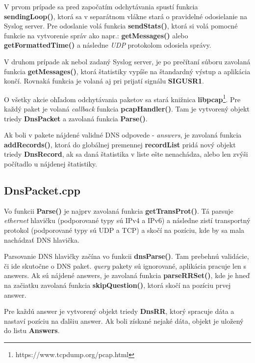 \documentclass{article}
\begin{document}
        V prvom prípade sa pred započatím odchytávania spustí funkcia \textbf{sendingLoop()},
        ktorá sa v separátnom vlákne stará o pravidelné odosielanie na Syslog server. Pre odoslanie volá funkcia \textbf{sendStats()}, ktorá si volá
        pomocné funkcie na vytvorenie správ ako napr.: \textbf{getMessages()} alebo \textbf{getFormattedTime()} a následne \emph{UDP} protokolom 
        odosiela správy.

        V druhom prípade ak nebol zadaný Syslog server, je po prečítaní súboru zavolaná funkcia \textbf{getMessages()}, ktorá štatistiky vypíše
        na štandardný výstup a aplikácia končí. Rovnaká funkcia je volaná aj pri prijatí signálu \textbf{SIGUSR1}.

        O všetky akcie ohľadom odchytávania paketov sa stará knižnica \textbf{libpcap}\footnote{https://www.tcpdump.org/pcap.html}. Pre každý paket
        je volaná \emph{callback} funkcia \textbf{pcapHandler()}. Tam je vytvorený objekt triedy \textbf{DnsPacket} a zavolaná funkcia \textbf{Parse()}.

        Ak boli v pakete nájdené validné DNS odpovede - \emph{answers}, je zavolaná funkcia \textbf{addRecords()}, ktorá do globálnej premennej \textbf{recordList} pridá nový
        objekt triedy \textbf{DnsRecord}, ak sa daná štatistika v liste ešte nenachádza, alebo len zvýši počítadlo u nájdenej štatistiky.

        \subsection{DnsPacket.cpp}
        Vo funkcii \textbf{Parse()} je najprv zavolaná funkcia \textbf{getTransProt()}. Tá parsuje \emph{ethernet} hlavičku (podporované typy sú IPv4 a IPv6)
        a následne zistí transportný protokol (podporované typy sú UDP a TCP) a skočí na pozíciu, kde by sa mala nachádzať DNS hlavička.

        Parsovanie DNS hlavičky začína vo funkcii \textbf{dnsParse()}. Tam prebehnú validácie, či ide skutočne o DNS paket. \emph{query} pakety sú
        ignorované, aplikácia pracuje len s answers. Ak sú nájdené answers, je zavolaná funkcia \textbf{parseRRSet()}, kde je hneď na začiatku zavolaná funkcia \textbf{skipQuestion()}, ktorá
        skočí na pozíciu prvej answer.

        Pre každú answer je vytvorený objekt triedy \textbf{DnsRR}, ktorý spracuje dáta a nastaví pozíciu na ďalšiu answer. Ak boli získané nejaké dáta, objekt je uložený do listu
        \textbf{Answers}.
\end{document}
